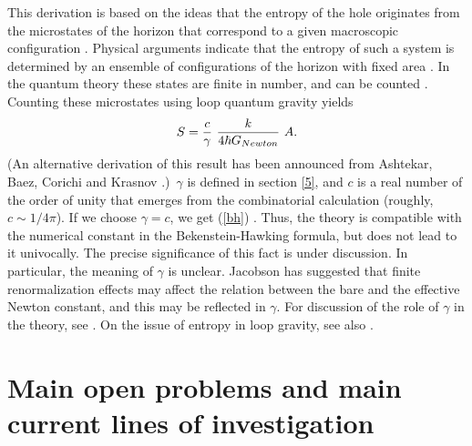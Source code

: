 \begin{itemize}
This derivation is based on the ideas that the entropy of the 
hole originates from the microstates of the horizon that 
correspond to a given macroscopic configuration 
\cite{York,Carlip95,Carlip97,Bala2,Bala}.  Physical arguments 
indicate that the entropy of such a system is determined by an 
ensemble of configurations of the horizon with fixed area 
\cite{Rovelli96}.  In the quantum theory these states are finite 
in number, and can be counted \cite{Krasnov,Krasnov2}.  Counting 
these microstates using loop quantum gravity yields
\begin{equation}
    S = \frac{c}{\gamma}\ {k\over 4 \hbar G_{Newton}} \ A.
\end{equation}
(An alternative derivation of this result has been announced from 
Ashtekar, Baez, Corichi and Krasnov \cite{AshtekarEtAl97}.)\ 
$\gamma$ is defined in section \ref{5}, and $c$ is a real number 
of the order of unity that emerges from the combinatorial 
calculation (roughly, $c \sim 1/4\pi$).  If we choose $\gamma=c$, 
we get (\ref{bh}) \cite{RovelliThiemann,CorichiKrasnov}.  Thus, 
the theory is compatible with the numerical constant in the 
Bekenstein-Hawking formula, but does not lead to it univocally.  
The precise significance of this fact is under discussion.  In 
particular, the meaning of $\gamma$ is unclear.  Jacobson has 
suggested \cite{Jacobson} that finite renormalization effects may 
affect the relation between the bare and the effective Newton 
constant, and this may be reflected in $\gamma$.  For discussion 
of the role of $\gamma$ in the theory, see 
\cite{RovelliThiemann}.  On the issue of entropy in loop gravity, 
see also \cite{Smolin95}.

\end{itemize}
  
\section{Main open problems and main current lines of 
investigation}\label{7}

